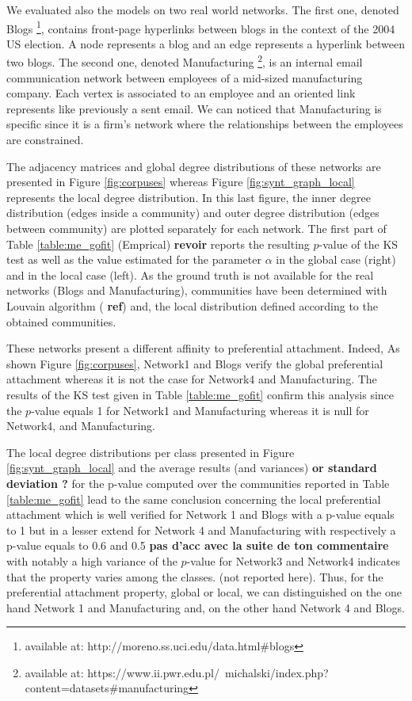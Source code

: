 We evaluated also the models on two real world networks.
The first one, denoted Blogs \footnote{available at: http://moreno.ss.uci.edu/data.html\#blogs}, contains front-page hyperlinks between blogs in the context of the 2004 US election. A node represents a blog and an edge represents a hyperlink between two blogs.
The second one, denoted Manufacturing \footnote{available at: https://www.ii.pwr.edu.pl/~michalski/index.php?content=datasets\#manufacturing}, is an internal email communication network between employees of a mid-sized manufacturing company. Each vertex is associated  to an employee and an oriented link represents like previously a sent email. We can noticed that Manufacturing is specific since it is a firm's network where the relationships between the employees are constrained. 


The adjacency matrices and global degree distributions of these networks are presented in Figure \ref{fig:corpuses} whereas Figure \ref{fig:synt_graph_local} represents the local degree distribution. In this last figure, the inner degree distribution (edges inside a community) and outer degree distribution (edges between community) are plotted separately for each network. The first part of Table \ref{table:me_gofit} (Emprical) \textbf{revoir} reports  the resulting $p$-value of the KS test as well as the  value estimated for the parameter  $\alpha$ in the global case (right) and in the local case (left). As the ground truth is not available for the real networks (Blogs and Manufacturing), communities have been determined with Louvain algorithm ( \textbf{ref}) and, the local distribution defined according to the obtained communities. 

These networks present a different affinity to preferential attachment.
Indeed, As shown Figure \ref{fig:corpuses}, Network1 and Blogs verify the  global preferential attachment whereas it is not the case for Network4 and Manufacturing. The results of the KS test given in Table \ref{table:me_gofit} confirm this analysis since the $p$-value equals 1 for Network1 and Manufacturing whereas it is null for Network4, and Manufacturing.

The local degree distributions per class presented in Figure \ref{fig:synt_graph_local} and the average results (and variances) \textbf{or standard deviation ?} for the p-value computed over the communities reported in Table \ref{table:me_gofit} lead to the same conclusion concerning the local preferential attachment which is well verified for Network 1 and Blogs with a p-value equals to 1 but in a lesser extend for Network 4 and Manufacturing with respectively a p-value equals to 0.6 and 0.5 \textbf{pas d'acc avec la suite de ton commentaire} with notably a high variance of the $p$-value for Network3 and Network4 indicates that the property varies among the classes. (not reported here). Thus, for the preferential attachment property, global or local, we can distinguished on the one hand Network 1 and Manufacturing and, on the other hand Network 4 and Blogs. 

